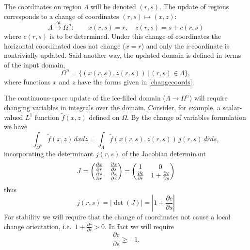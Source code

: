\documentclass[letterpaper,final,12pt,reqno]{amsart}
\begin{document}
The coordinates on region $\Lambda$ will be denoted $(r,s)$.  The update of regions corresponds to a change of coordinates $(r,s) \mapsto (x,z)$:
\begin{equation}
\Lambda \stackrel{\Delta t}{\to} \Omega^n: \qquad x(r,s)=r, \quad z(r,s)=s+c(r,s) \label{changecoords}
\end{equation}
where $c(r,s)$ is to be determined.  Under this change of coordinates the horizontal coordinated does not change ($x=r$) and only the $z$-coordinate is nontrivially updated.  Said another way, the updated domain is defined in terms of the input domain,
\begin{equation}
\Omega^n = \{(x(r,s),z(r,s)) \,\big|\, (r,s) \in \Lambda\},  \label{updateddomain}
\end{equation}
where functions $x$ and $z$ have the forms given in \eqref{changecoords}.

The continuous-space update of the ice-filled domain ($\Lambda\to\Omega^n$) will require changing variables in integrals over the domain.  Consider, for example, a scalar-valued $L^1$ function $\tilde f(x,z)$ defined on $\Omega$.  By the change of variables formulation we have
\begin{equation}
\int_{\Omega^n} \tilde f(x,z)\,dx dz = \int_\Lambda \tilde f(x(r,s),z(r,s)) \, j(r,s)\,dr ds, \label{changeintegralearly}
\end{equation}
incorporating the determinant $j(r,s)$ of the Jacobian determinant
\begin{equation}
J = \begin{pmatrix} \frac{\partial x}{\partial r} & \frac{\partial x}{\partial s} \\ {\large\strut} \frac{\partial z}{\partial r} & \frac{\partial z}{\partial z} \end{pmatrix} = \begin{pmatrix} 1 & 0 \\ \frac{\partial c}{\partial r} & 1+\frac{\partial c}{\partial s} \end{pmatrix} \label{jacchange}
\end{equation}
thus
\begin{equation}
j(r,s) = |\det(J)| = \left|1+\frac{\partial c}{\partial s}\right|  \label{jacchangedet}
\end{equation}
For stability we will require that the change of coordinates not cause a local change orientation, i.e.~$1+\frac{\partial c}{\partial s}>0$.  In fact we will require
\begin{equation}
\frac{\partial c}{\partial s} \ge -1.\label{differentialVI}
\end{equation}
\end{document}
